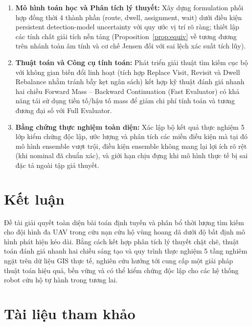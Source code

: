 \documentclass[12pt,a4paper]{article}
\begin{document}
\begin{enumerate}[label=\textbf{Đóng góp \arabic*:}]
    \item \textbf{Mô hình toán học và Phân tích lý thuyết:} Xây dựng formulation phối hợp đồng thời 4 thành phần (route, dwell, assignment, wait) dưới điều kiện persistent detection-model uncertainty với quy ước vị trí rõ ràng; thiết lập các tính chất giải tích nền tảng (Proposition~\ref{prop:equiv} về tương đương trên nhánh toàn âm tính và cơ chế Jensen đối với sai lệch xác suất tích lũy).
    \item \textbf{Thuật toán và Công cụ tính toán:} Phát triển giải thuật tìm kiếm cục bộ với không gian biến đổi linh hoạt (tích hợp Replace Visit, Revisit và Dwell Rebalance nhằm tránh bẫy kẹt ngân sách) kết hợp kỹ thuật đánh giá nhanh hai chiều Forward Mass -- Backward Continuation (Fast Evaluator) có khả năng tái sử dụng tiền tố/hậu tố mass để giảm chi phí tính toán và tương đương đại số với Full Evaluator.
    \item \textbf{Bằng chứng thực nghiệm toàn diện:} Xác lập bộ kết quả thực nghiệm 5 lớp kiểm chứng độc lập, ước lượng và phân tích các miền điều kiện mà tại đó mô hình ensemble vượt trội, điều kiện ensemble không mang lại lợi ích rõ rệt (khi nominal đã chuẩn xác), và giới hạn chịu đựng khi mô hình thực tế bị sai đặc tả ngoài tập giả thuyết.
\end{enumerate}

\section{Kết luận}

Đề tài giải quyết toàn diện bài toán định tuyến và phân bổ thời lượng tìm kiếm cho đội hình đa UAV trong cứu nạn cứu hộ vùng hoang dã dưới độ bất định mô hình phát hiện kéo dài. Bằng cách kết hợp phân tích lý thuyết chặt chẽ, thuật toán đánh giá nhanh hai chiều sáng tạo và quy trình thực nghiệm 5 tầng nghiêm ngặt trên dữ liệu GIS thực tế, nghiên cứu hướng tới cung cấp một giải pháp thuật toán hiệu quả, bền vững và có thể kiểm chứng độc lập cho các hệ thống robot cứu hộ tự hành trong tương lai.

\section*{Tài liệu tham khảo}
\end{document}
